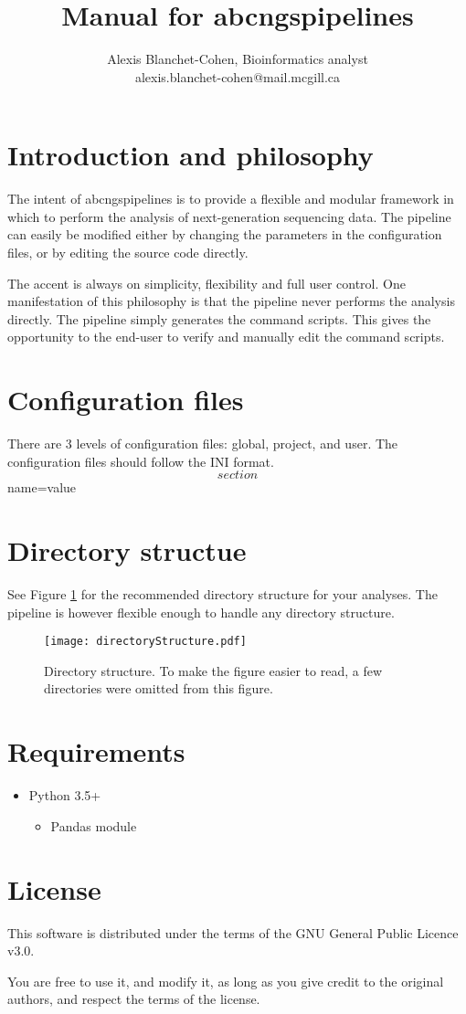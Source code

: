 \documentclass[12pt]{article}
\title{ Manual for abcngspipelines }
\author{ Alexis Blanchet-Cohen, Bioinformatics analyst \\ alexis.blanchet-cohen@mail.mcgill.ca}
\begin{document}
\maketitle
\thispagestyle{empty} %

\newpage
\tableofcontents
\newpage

\section{Introduction and philosophy}

The intent of abcngspipelines is to provide a flexible and modular framework in which to perform the analysis of next-generation sequencing data.
The pipeline can easily be modified either by changing the parameters in the configuration files, or by editing the source code directly.

The accent is always on simplicity, flexibility and full user control.
One manifestation of this philosophy is that the pipeline never performs the analysis directly. The pipeline simply generates the command scripts. This gives the opportunity to the end-user to verify and manually edit the command scripts.

\section{Configuration files}
There are 3 levels of configuration files: global, project, and user.
The configuration files should follow the INI format.
\[section\]
name=value

\section{Directory structue}
See Figure \ref{figure:directorystructure} for the recommended directory structure for your analyses.
The pipeline is however flexible enough to handle any directory structure.

\begin{figure}[htb]
\centering
\texttt{[image: directoryStructure.pdf]}
\caption{Directory structure. To make the figure easier to read, a few directories were omitted from this figure.}
\label{figure:directorystructure}
\end{figure}

\section{Requirements}
\begin{itemize}
    \item{Python 3.5+}
    \begin{itemize}
	\item{Pandas module}
    \end{itemize}
\end{itemize}

\section{License}
This software is distributed under the terms of the GNU General Public Licence v3.0.

You are free to use it, and modify it, as long as you give credit to the original authors, and respect the terms of the license.

\clearpage


\end{document}
